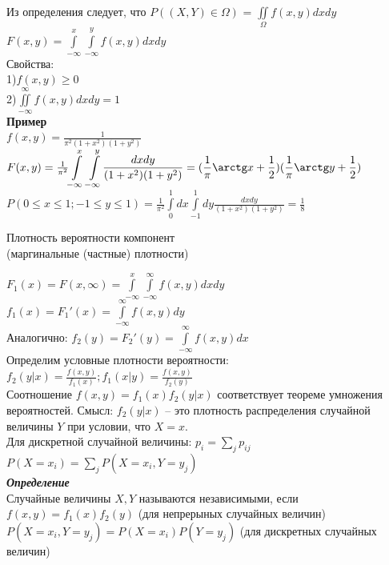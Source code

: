 \documentclass[russian, 12pt, fleqn]{article}
\begin{document}
Из  определения следует, что $P((X, Y) \in \Omega)$  = $\displaystyle{\iint\limits_{\Omega}} f(x, y)dxdy$\\
$F(x, y) = \displaystyle{\int\limits_{-\infty}^{x} \int\limits_{-\infty}^{y} f(x, y) dx dy}$\\
Свойства:\\
1)$f(x, y) \geq 0$\\
2)$\iint\limits_{-\infty}^{\infty} f(x, y) dxdy = 1$\\
\textbf{Пример} \\
$f(x, y) = \frac{1}{\pi^2(1+x^2)(1+y^2)}$\\
$F(x, y) = \frac{1}{\pi^2} \displaystyle{\int\limits_{-\infty}^{x}  \int\limits_{-\infty}^{y}} \frac{dxdy}{(1+x^2)(1+y^2)} = (\frac{1}{\pi}\arctg x + \frac{1}{2}) (\frac{1}{\pi}\arctg y + \frac{1}{2})$\\
$P(0\leq x \leq 1; -1 \leq y \leq 1) = \frac{1}{\pi^2} \displaystyle{\int\limits_{0}^{1}dx\int\limits_{-1}^{1} dy \frac{dxdy}{(1+x^2)(1+y^2)}} = \frac{1}{8}$
\begin{center}
$\textbf{Плотность вероятности компонент}$\\
(маргинальные (частные) плотности)
\end{center}
$F_1(x) = F(x, \infty)  = \displaystyle{\int\limits_{-\infty}^{x}\int\limits_{-\infty}^{\infty}f(x, y)dxdy}$\\
$f_1(x) = F_1'(x) = \displaystyle{\int \limits_{-\infty}^{\infty}} f(x, y) dy$\\
Аналогично: $f_2(y) = F_2'(y) = \displaystyle{\int \limits_{-\infty}^{\infty}} f(x, y) dx$\\
Определим условные плотности вероятности: $f_2(y|x) = \frac{f(x,y)}{f_1(x)};f_1(x|y) = \frac{f(x,y)}{f_2(y)}$\\
Соотношение $f(x, y) = f_1(x) f_2(y|x)$ соответствует теореме умножения вероятностей. Смысл: $f_2(y|x)$ -- это плотность распределения случайной величины $Y$ при условии, что $X=x$.\\
Для дискретной случайной величины: $p_i = \sum\limits_{j} p_{ij}$\\
$P(X=x_i) =  \sum\limits_{j} P(X=x_i, Y=y_j)$\\
\textit{\textbf{Определение}}\\
Случайные величины $X, Y$ называются независимыми, если $f(x, y) = f_1(x)f_2(y)$ (для непрерыных случайных величин)\\
$ P(X = x_i, Y = y_j) = P(X=x_i) P(Y=y_j)$ (для дискретных случайных  величин)\\
\end{document}
